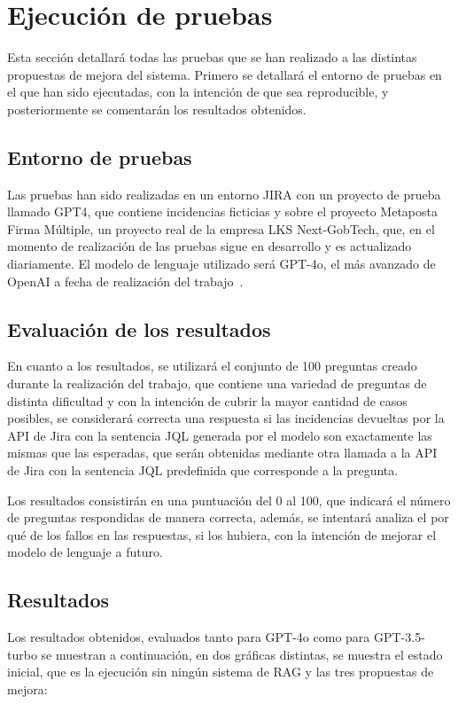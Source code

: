\section{Ejecución de pruebas}
Esta sección detallará todas las pruebas que se han realizado a las distintas propuestas de mejora del sistema. Primero se detallará el entorno de pruebas en el que han sido ejecutadas, con la intención de que sea reproducible, y posteriormente se comentarán los resultados obtenidos.

\subsection{Entorno de pruebas}
Las pruebas han sido realizadas en un entorno JIRA con un proyecto de prueba llamado GPT4, que contiene incidencias ficticias y sobre el proyecto Metaposta Firma Múltiple, un proyecto real de la empresa LKS Next-GobTech, que, en el momento de realización de las pruebas sigue en desarrollo y es actualizado diariamente. El modelo de lenguaje utilizado será GPT-4o, el más avanzado de OpenAI a fecha de realización del trabajo~\cite{gpt4o}. 

\subsection{Evaluación de los resultados}
En cuanto a los resultados, se utilizará el conjunto de 100 preguntas creado durante la realización del trabajo, que contiene una variedad de preguntas de distinta dificultad y con la intención de cubrir la mayor cantidad de casos posibles, se considerará correcta una respuesta si las incidencias devueltas por la API de Jira con la sentencia JQL generada por el modelo son exactamente las mismas que las esperadas, que serán obtenidas mediante otra llamada a la API de Jira con la sentencia JQL predefinida que corresponde a la pregunta.

Los resultados consistirán en una puntuación del 0 al 100, que indicará el número de preguntas respondidas de manera correcta, además, se intentará analiza el por qué de los fallos en las respuestas, si los hubiera, con la intención de mejorar el modelo de lenguaje a futuro.

\subsection{Resultados}
Los resultados obtenidos, evaluados tanto para GPT-4o como para GPT-3.5-turbo se muestran a continuación, en dos gráficas distintas, se muestra el estado inicial, que es la ejecución sin ningún sistema de RAG y las tres propuestas de mejora:

